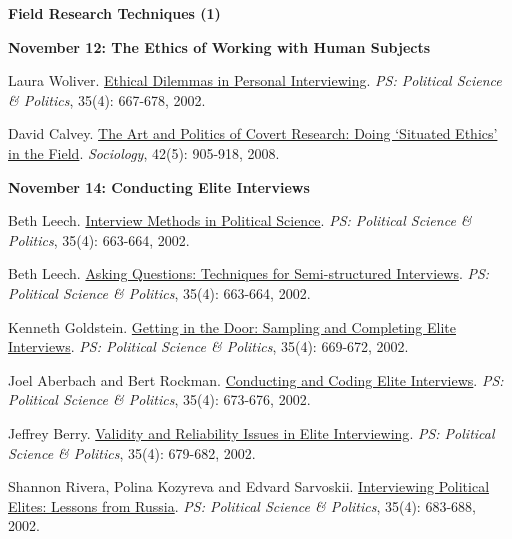 \documentclass[letterpaper]{article}
\renewenvironment{itemize}{
  \begin{list}{}{
    \setlength{\leftmargin}{1.5em}
  }
}{
  \end{list}
}
\begin{document}
\begin{enumerate}
\item {\bf Field Research Techniques (1)}
		
		\begin{itemize}
		\item {\bf November 12: The Ethics of Working with Human Subjects}
			\begin{itemize}
				\item[$\bullet$] Laura Woliver. \href{https://dornsife.usc.edu/assets/sites/298/docs/interviewing_techniques_ethical_dilemmas.pdf}{Ethical Dilemmas in Personal Interviewing}. \emph{PS: Political Science \& Politics}, 35(4): 667-678, 2002.
				\item[$\bullet$] David Calvey. \href{http://journals.sagepub.com/doi/pdf/10.1177/0038038508094569}{The Art and Politics of Covert Research: Doing `Situated Ethics' in the Field}. \emph{Sociology}, 42(5): 905-918, 2008. 
			\end{itemize}
		\end{itemize}


		\begin{itemize}
		\item {\bf November 14: Conducting Elite Interviews}
			\begin{itemize}
				\item[$\bullet$] Beth Leech. \href{https://doi.org/10.1017/S1049096502001117}{Interview Methods in Political Science}. \emph{PS: Political Science \& Politics}, 35(4): 663-664, 2002.
				\item[$\bullet$] Beth Leech. \href{https://dornsife.usc.edu/assets/sites/298/docs/interviewing_techniques_asking_questions.pdf}{Asking Questions: Techniques for Semi-structured Interviews}. \emph{PS: Political Science \& Politics}, 35(4): 663-664, 2002. 
				\item[$\bullet$] Kenneth Goldstein. \href{https://dornsife.usc.edu/assets/sites/298/docs/interviewing_techniques_sampling.pdf}{Getting in the Door: Sampling and Completing Elite Interviews}. \emph{PS: Political Science \& Politics}, 35(4): 669-672, 2002.  
				\item[$\bullet$] Joel Aberbach and Bert Rockman. \href{http://observatory-elites.org/wp-content/uploads/2012/06/Conducting-and-Coding-Elite-Interviews.pdf}{Conducting and Coding Elite Interviews}. \emph{PS: Political Science \& Politics}, 35(4): 673-676, 2002. 
				\item[$\bullet$] Jeffrey Berry. \href{https://doi.org/10.1017/S1049096502001166}{Validity and Reliability Issues in Elite Interviewing}. \emph{PS: Political Science \& Politics}, 35(4): 679-682, 2002. 
				\item[$\bullet$] Shannon Rivera, Polina Kozyreva and Edvard Sarvoskii. \href{https://doi.org/10.1017/S1049096502001178}{Interviewing Political Elites: Lessons from Russia}. \emph{PS: Political Science \& Politics}, 35(4): 683-688, 2002. 
			\end{itemize}
		\end{itemize}



\end{enumerate}
\end{document}

